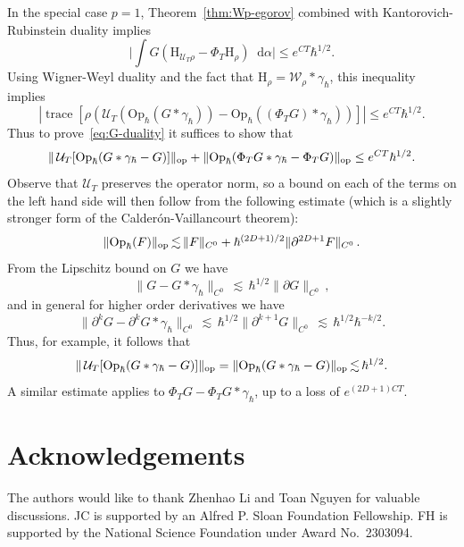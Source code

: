 \documentclass[11pt]{amsart}
\def\Wigner{{\mathcal W}}
\def\Husimi{{\mathrm{H}}}
\def\Op{\mathrm{Op}}
\def\trace{\operatorname*{trace}}
\newcommand{\diff}{\mathop{}\!\mathrm{d}}
\def\lsim{{\,\lesssim\,}}
\newcommand{\mcal}[1]{{\mathcal{#1}}}
\numberwithin{equation}{section}
\begin{document}
In the special case $p=1$, Theorem~\ref{thm:Wp-egorov} combined with Kantorovich-Rubinstein duality implies
\[
\Big|\int G (\Husimi_{\mcal{U}_T\rho} - \Phi_T \Husimi_\rho) \diff \alpha\Big| \leq e^{CT} \hbar^{1/2}.
\]
Using Wigner-Weyl duality and the fact that $\Husimi_\rho = \Wigner_\rho \ast \gamma_\hbar$, this inequality
implies
\[
|\trace[\rho (\mcal{U}_T(\Op_\hbar(G \ast \gamma_\hbar)) - \Op_\hbar((\Phi_T G) \ast \gamma_\hbar))]|
\leq e^{CT}\hbar^{1/2}.
\]
Thus to prove~\eqref{eq:G-duality} it suffices to show that
\[
\|\,\mcal{U}_T[\Op_\hbar (G\ast \gamma_\hbar -G)]\|_{\rm op}
+
\|\Op_\hbar ( \Phi_T G\ast \gamma_\hbar - \Phi_T G)\|_{\rm op} \leq e^{CT}\hbar^{1/2}.
\]
Observe that $\mcal{U}_T$ preserves the operator norm, so a bound on each of the terms on the left hand side
will then follow from the following estimate (which is a slightly stronger form of the Calder\'on-Vaillancourt theorem):
\[
\|\Op_\hbar(F)\|_{\rm op} \lsim \|F\|_{C^0} + \hbar^{(2D+1)/2}\|\partial^{2D+1} F\|_{C^0}\,.
\]
From the Lipschitz bound on $G$ we have
\[
\|G - G\ast \gamma_\hbar\|_{C^0} \lsim \hbar^{1/2} \|\partial G\|_{C^0}\,,
\]
and in general for higher order derivatives we have
\[
\|\partial^k G - \partial^k G\ast \gamma_\hbar\|_{C^0} \lsim \hbar^{1/2} \|\partial^{k+1} G\|_{C^0}
\lsim \hbar^{1/2} \hbar^{-k/2}.
\]
Thus, for example, it follows that
\[
\|\,\mcal{U}_T[\Op_\hbar (G\ast \gamma_\hbar -G)]\|_{\rm op}
=
\|\Op_\hbar (G\ast \gamma_\hbar -G)\|_{\rm op} \lsim \hbar^{1/2}.
\]
A similar estimate applies to $\Phi_T G - \Phi_T G\ast \gamma_\hbar$, up to a loss of $e^{(2D+1)C T}$.

\section*{Acknowledgements}

The authors would like to thank Zhenhao Li and Toan Nguyen for valuable discussions.  JC is supported by an Alfred P. Sloan Foundation Fellowship.  FH is supported by the National Science Foundation under Award No.~2303094.

\printbibliography
\end{document}
